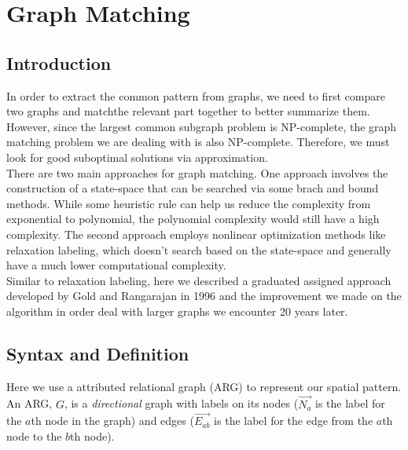 \chapter{Graph Matching}
\label{chap: graphmatching}

\section{Introduction}

In order to extract the common pattern from graphs, we need to first compare two graphs and match\footnotemark the relevant part together to better summarize them. However, since the largest common subgraph problem is NP-complete, the graph matching problem we are dealing with is also NP-complete\footnotemark. Therefore, we must look for good suboptimal solutions via approximation.
\\

There are two main approaches for graph matching. One approach involves the construction of a state-space that can be searched via some brach and bound methods. While some heuristic rule can help us reduce the complexity from exponential to polynomial, the polynomial complexity would still have a high complexity. The second approach employs nonlinear optimization methods like relaxation labeling, which doesn't search based on the state-space and generally have a much lower computational complexity.\\

Similar to relaxation labeling, here we described a graduated assigned approach developed by Gold and Rangarajan in 1996 and the improvement we made on the algorithm in order deal with larger graphs we encounter 20 years later.

\section{Syntax and Definition}

Here we use a attributed relational graph (ARG) to represent our spatial pattern. An ARG, $G$, is a \emph{directional} graph with labels on its nodes ($\overrightarrow{N_{a}}$ is the label for the $a$th node in the graph) and edges ($\overrightarrow{E_{ab}}$ is the label for the edge from the $a$th node to the $b$th node). \\

